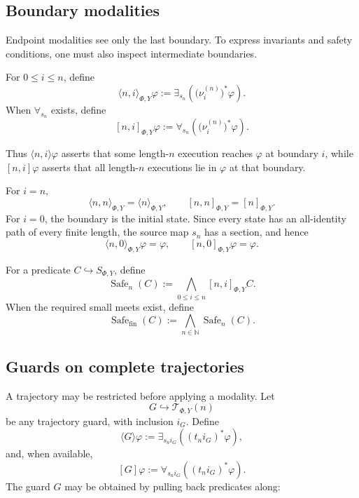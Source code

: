 \subsection{Boundary modalities}
\label{subsec:dynamic-trajectory-boundary-modalities}

Endpoint modalities see only the last boundary.  To express invariants and
safety conditions, one must also inspect intermediate boundaries.

\begin{definition}
\label{def:dynamic-trajectory-boundary-modalities}
For \(0\leq i\leq n\), define
\[
    \langle n,i\rangle_{\Phi,Y}\varphi
    :=
    \exists_{s_n}
    \left(
        \bigl(\nu_i^{(n)}\bigr)^\ast\varphi
    \right).
\]
When \(\forall_{s_n}\) exists, define
\[
    [n,i]_{\Phi,Y}\varphi
    :=
    \forall_{s_n}
    \left(
        \bigl(\nu_i^{(n)}\bigr)^\ast\varphi
    \right).
\]
\end{definition}

Thus \(\langle n,i\rangle\varphi\) asserts that some length-\(n\) execution
reaches \(\varphi\) at boundary \(i\), while \([n,i]\varphi\) asserts that all
length-\(n\) executions lie in \(\varphi\) at that boundary.

For \(i=n\),
\[
    \langle n,n\rangle_{\Phi,Y}
    =
    \langle n\rangle_{\Phi,Y},
    \qquad
    [n,n]_{\Phi,Y}
    =
    [n]_{\Phi,Y}.
\]
For \(i=0\), the boundary is the initial state.  Since every state has an
all-identity path of every finite length, the source map \(s_n\) has a section,
and hence
\[
    \langle n,0\rangle_{\Phi,Y}\varphi=\varphi,
    \qquad
    [n,0]_{\Phi,Y}\varphi=\varphi.
\]

\begin{definition}
\label{def:dynamic-finite-horizon-safety}
For a predicate \(C\hookrightarrow S_{\Phi,Y}\), define
\[
    \operatorname{Safe}_n(C)
    :=
    \bigwedge_{0\leq i\leq n}
    [n,i]_{\Phi,Y}C.
\]
When the required small meets exist, define
\[
    \operatorname{Safe}_{\mathrm{fin}}(C)
    :=
    \bigwedge_{n\in\mathbb N}
    \operatorname{Safe}_n(C).
\]
\end{definition}

\subsection{Guards on complete trajectories}
\label{subsec:dynamic-guarded-trajectory-modalities}

A trajectory may be restricted before applying a modality.  Let
\[
    G\hookrightarrow\mathscr T_{\Phi,Y}(n)
\]
be any trajectory guard, with inclusion \(i_G\).  Define
\[
    \langle G\rangle\varphi
    :=
    \exists_{s_ni_G}
    \left(
        (t_ni_G)^\ast\varphi
    \right),
\]
and, when available,
\[
    [G]\varphi
    :=
    \forall_{s_ni_G}
    \left(
        (t_ni_G)^\ast\varphi
    \right).
\]
The guard \(G\) may be obtained by pulling back predicates along:

